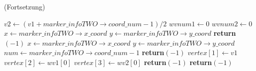 \begin{algorithm}[ht]
\caption{ (Fortsetzung)}
\label{alg:checksquare-6}
\begin{algorithmic}[1]
		\State $\mathit{v2} \gets (\mathit{v1} + \mathit{marker\_infoTWO \to coord\_num} - 1) / 2$
		\label{alg:checksquare-6-v2}
		\State $\mathit{wvnum1} \gets 0$
		\State $\mathit{wvnum2} \gets 0$
		\State $x \gets \mathit{marker\_infoTWO \to x\_coord}$
		\State $y \gets \mathit{marker\_infoTWO \to y\_coord}$
		\label{alg:checksquare-6-vertex1}
			\State \textbf{return}$(-1)$
		\EndIf
		\State $x \gets \mathit{marker\_infoTWO \to x\_coord}$
		\State $y \gets \mathit{marker\_infoTWO \to y\_coord}$
		\State $\mathit{num} \gets \mathit{marker\_infoTWO \to coord\_num} - 1$
		\label{alg:checksquare-6-vertex2}
			\State \textbf{return}$(-1)$
		\EndIf
			\State $\mathit{vertex}[1] \gets \mathit{v1}$
			\State $\mathit{vertex}[2] \gets \mathit{wv1}[0]$
			\State $\mathit{vertex}[3] \gets \mathit{wv2}[0]$
		\Else
			\State \textbf{return}$(-1)$
		\EndIf
	\Else
		\State \textbf{return}$(-1)$
	\EndIf
\end{algorithmic}
\end{algorithm}
